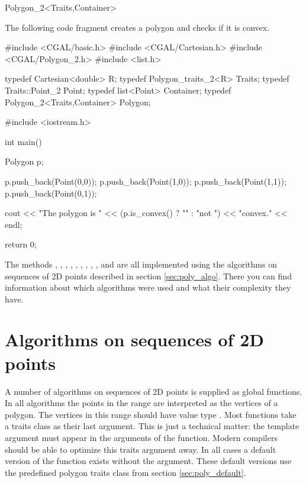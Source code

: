 \begin{ccClassTemplate}{Polygon_2<Traits,Container>}
\ccExample

The following code fragment creates a polygon and checks if it is convex.

\begin{cprog}
#include <CGAL/basic.h>
#include <CGAL/Cartesian.h>
#include <CGAL/Polygon_2.h>
#include <list.h>

typedef Cartesian<double> R;
typedef Polygon_traits_2<R> Traits;
typedef Traits::Point_2 Point;
typedef list<Point> Container;
typedef Polygon_2<Traits,Container> Polygon;

#include <iostream.h>

int main()
{
  Polygon p;

  p.push_back(Point(0,0));
  p.push_back(Point(1,0));
  p.push_back(Point(1,1));
  p.push_back(Point(0,1));

  cout << "The polygon is " << (p.is_convex() ? "" : "not ") << "convex." << endl;

  return 0;
}
\end{cprog}

The methods
,
,
,
,
,
,
,
,
,
 and
are all implemented using the algorithms on sequences of 2D points described
in section \ref{sec:poly_algo}. There you can find information about which
algorithms were used and what their complexity they have.

\end{ccClassTemplate}

\section{Algorithms on sequences of 2D points \label{sec:poly_algo}}

A number of algorithms on sequences of 2D points is supplied as global functions.
In all algorithms the points in the range \ccStyle{[first,last)} are interpreted
as the vertices of a polygon. The vertices in this range should have value type
. Most functions take a traits class as their last argument.
This is just a technical matter: the template argument  must
appear in the arguments of the function. Modern compilers should be able to
optimize this traits argument away. In all cases a default version of the function
exists without the  argument. These default versions use the predefined
polygon traits class from section \ref{sec:poly_default}.

